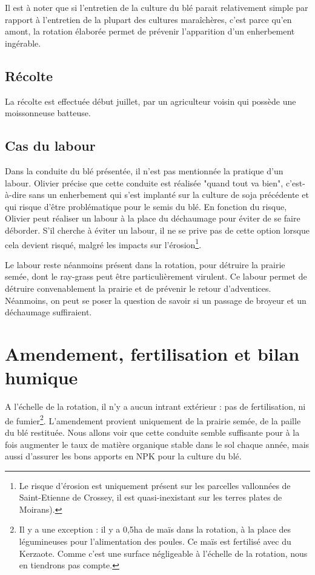 \documentclass{article}
\begin{document}
Il est à noter que si l'entretien de la culture du blé parait relativement simple par rapport à l'entretien de la plupart des cultures maraîchères, c'est parce qu'en amont, la rotation élaborée permet de prévenir l'apparition d'un enherbement ingérable. 

\subsection{Récolte}

La récolte est effectuée début juillet, par un agriculteur voisin qui possède une moissonneuse batteuse. 

\subsection{Cas du labour}

Dans la conduite du blé présentée, il n'est pas mentionnée la pratique d'un labour. Olivier précise que cette conduite est réalisée "quand tout va bien", c'est-à-dire sans un enherbement qui s'est implanté sur la culture de soja précédente et qui risque d'être problématique pour le semis du blé. En fonction du risque, Olivier peut réaliser un labour à la place du déchaumage pour éviter de se faire déborder. S'il cherche à éviter un labour, il ne se prive pas de cette option lorsque cela devient risqué, malgré les impacts sur l'érosion\footnote{Le risque d'érosion est uniquement présent sur les parcelles vallonnées de Saint-Etienne de Crossey, il est quasi-inexistant sur les terres plates de Moirans).}.

Le labour reste néanmoins présent dans la rotation, pour détruire la prairie semée, dont le ray-grass peut être particulièrement virulent. Ce labour permet de détruire convenablement la prairie et de prévenir le retour d'adventices. Néanmoins, on peut se poser la question de savoir si un passage de broyeur et un déchaumage suffiraient.

\section{Amendement, fertilisation et bilan humique}

A l'échelle de la rotation, il n'y a aucun intrant extérieur : pas de fertilisation, ni de fumier\footnote{Il y a une exception : il y a 0,5ha de maïs dans la rotation, à la place des légumineuses pour l'alimentation des poules. Ce maïs est fertilisé avec du Kerzaote. Comme c'est une surface négligeable à l'échelle de la rotation, nous en tiendrons pas compte.}. L'amendement provient uniquement de la prairie semée, de la paille du blé restituée. Nous allons voir que cette conduite semble suffisante pour à la fois augmenter le taux de matière organique stable dans le sol chaque année, mais aussi d'assurer les bons apports en NPK pour la culture du blé. 
\end{document}
